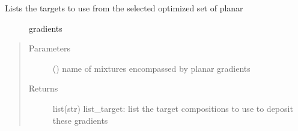 \documentclass[letterpaper,10pt,english]{sphinxmanual}
\begin{document}
\begin{fulllineitems}
\label{\detokenize{ExperimentsPlannification:modules.listing_targets_3cath}}\begin{description}
\item[{Lists the targets to use from the selected optimized set of planar}] \leavevmode
\sphinxAtStartPar
gradients

\end{description}
\begin{quote}\begin{description}
\item[{Parameters}] \leavevmode
\sphinxAtStartPar
{} () \textendash{} name of mixtures encompassed by planar gradients

\item[{Returns}] \leavevmode
\sphinxAtStartPar
list(str) list\_target: list the target compositions to use to deposit these gradients

\end{description}\end{quote}

\end{fulllineitems}

\label{\detokenize{ExperimentsPlannification:module-modules}}
\end{document}
